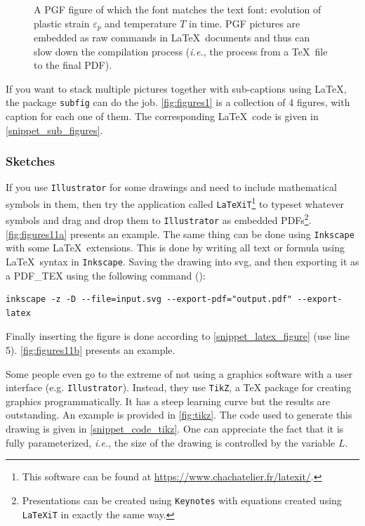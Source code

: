 \documentclass[authoryear,3p,times,preprint,review,fleqn]{elsarticle}
\newcommand{\ie}{\textit{i.e.},\xspace}
\numberwithin{equation}{section}
\theoremstyle{remark}
\begin{document}
\begin{figure}[!h]
  \centering
  
  \caption{A PGF figure of which the font matches the text font: 
  evolution of plastic strain $\varepsilon_p$ and temperature  $T$ in time. PGF pictures are embedded as raw commands in \LaTeX\ documents and thus can slow down the compilation process (\ie the process from a \TeX\ file to the final PDF).}
  \label{fig:cold-spray-plot-pgf}
\end{figure}



If you want to stack multiple pictures together with sub-captions using \LaTeX, the package \texttt{subfig} can do the job. \cref{fig:figures1} is a collection of 4 figures, with caption for each one of them. The corresponding \LaTeX\ code is given in \cref{snippet_sub_figures}.

\subsubsection{Sketches}\label{sec:sketches}

If you use \texttt{Illustrator} for some drawings and need to include mathematical symbols in them, then try the application called \texttt{LaTeXiT}\footnote{This software can be found at \url{https://www.chachatelier.fr/latexit/}.} to typeset whatever symbols and drag and drop them to \texttt{Illustrator} as embedded PDFs\footnote{Presentations can be created using \texttt{Keynotes} with equations created using \texttt{LaTeXiT} in exactly the same way.}.  \cref{fig:figures11a} presents an example. The same thing can be done using \texttt{Inkscape} with some \LaTeX\ extensions. This is done by writing all text or formula using \LaTeX\ syntax in \texttt{Inkscape}. Saving the drawing into svg, and then exporting it as a PDF\_TEX using the following command (\cite{inkscape}):
\begin{verbatim}
inkscape -z -D --file=input.svg --export-pdf="output.pdf" --export-latex
\end{verbatim}
Finally inserting the figure is done according to \cref{snippet_latex_figure} (use line 5). \cref{fig:figures11b} presents an example.

Some people even go to the extreme of not using a graphics software with a user interface (e.g. \texttt{Illustrator}). Instead, they use  \texttt{TikZ}, a TeX package for creating graphics programmatically. It has a steep learning curve but the results are outstanding. An example is provided in \cref{fig:tikz}. The code used to generate this drawing is given in \cref{snippet_code_tikz}. One can appreciate the fact that it is fully parameterized, \ie the size of the drawing is controlled by the variable $L$.
\end{document}
